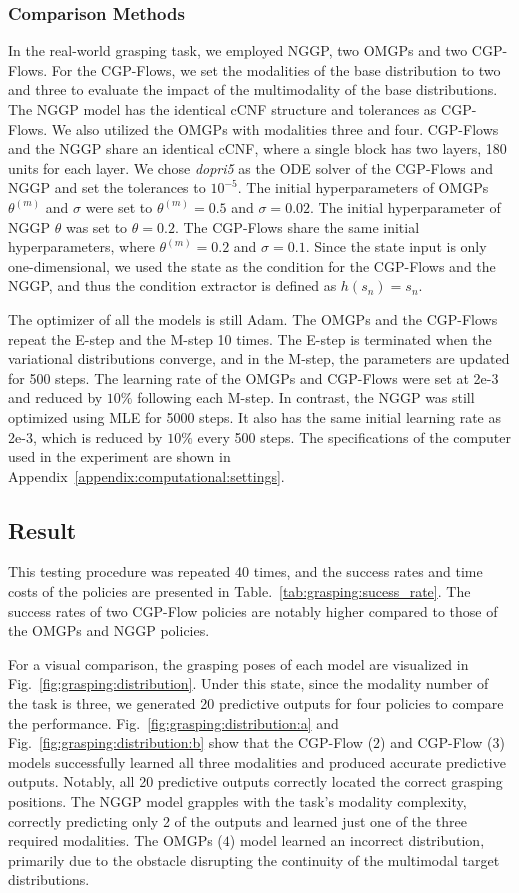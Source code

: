 \documentclass[sn-mathphys-num]{sn-jnl}
\begin{document}
\subsubsection{Comparison Methods}
In the real-world grasping task, we employed NGGP, two OMGPs and two CGP-Flows.
For the CGP-Flows, we set the modalities of the base distribution to two and three to evaluate the impact of the multimodality of the base distributions.
The NGGP model has the identical cCNF structure and tolerances as CGP-Flows.
We also utilized the OMGPs with modalities three and four.
CGP-Flows and the NGGP share an identical cCNF, where a single block has two layers, 180 units for each layer.
We chose \textit{dopri5} as the ODE solver of the CGP-Flows and NGGP and set the tolerances to $10^{-5}$.
The initial hyperparameters of OMGPs $\theta^{(m)}$ and $\sigma$ were set to $\theta^{(m)}=0.5$ and $\sigma=0.02$.
The initial hyperparameter of NGGP $\theta$ was set to $\theta=0.2$.
The CGP-Flows share the same initial hyperparameters, where $\theta^{(m)}=0.2$ and $\sigma=0.1$.
Since the state input is only one-dimensional, we used the state as the condition for the CGP-Flows and the NGGP, and thus the condition extractor is defined as $h(s_n)=s_n$.

The optimizer of all the models is still Adam. 
The OMGPs and the CGP-Flows repeat the E-step and the M-step 10 times.
The E-step is terminated when the variational distributions converge, and in the M-step, the parameters are updated for 500 steps.
The learning rate of the OMGPs and CGP-Flows were set at 2e-3 and reduced by $10\%$ following each M-step.
In contrast, the NGGP was still optimized using MLE for 5000 steps.
It also has the same initial learning rate as 2e-3, which is reduced by $10\%$ every 500 steps.
The specifications of the computer used in the experiment are shown in Appendix~\ref{appendix:computational:settings}.

\subsection{Result}
This testing procedure was repeated 40 times, and the success rates and time costs of the policies are presented in Table.~\ref{tab:grasping:sucess_rate}.
The success rates of two CGP-Flow policies are notably higher compared to those of the OMGPs and NGGP policies.


For a visual comparison, the grasping poses of each model are visualized in Fig.~\ref{fig:grasping:distribution}.
Under this state, since the modality number of the task is three, we generated 20 predictive outputs for four policies to compare the performance.
Fig.~\ref{fig:grasping:distribution:a} and Fig.~\ref{fig:grasping:distribution:b} show that the CGP-Flow ($2$) and CGP-Flow ($3$) models successfully learned all three modalities and produced accurate predictive outputs. Notably, all 20 predictive outputs correctly located the correct grasping positions.
The NGGP model grapples with the task's modality complexity, correctly predicting only 2 of the outputs and learned just one of the three required modalities.
The OMGPs ($4$) model learned an incorrect distribution, primarily due to the obstacle disrupting the continuity of the multimodal target distributions.
\end{document}
